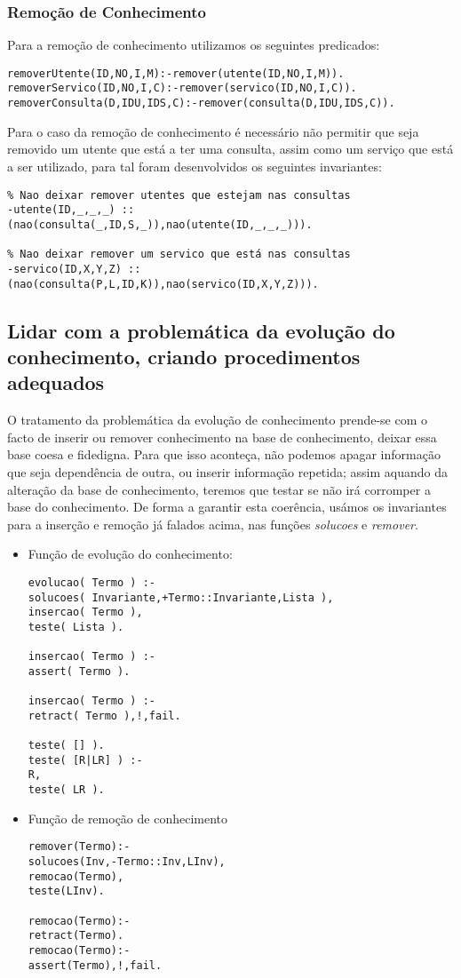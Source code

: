 \subsubsection{Remoção de Conhecimento}
Para a remoção de conhecimento utilizamos os seguintes predicados: 
\begin{verbatim}
removerUtente(ID,NO,I,M):-remover(utente(ID,NO,I,M)).
removerServico(ID,NO,I,C):-remover(servico(ID,NO,I,C)).
removerConsulta(D,IDU,IDS,C):-remover(consulta(D,IDU,IDS,C)).
\end{verbatim}

Para o caso da remoção de conhecimento é necessário não permitir que seja removido um utente que está a ter uma consulta, assim como um serviço que está a ser utilizado, para tal foram desenvolvidos os seguintes invariantes: 

\begin{verbatim}
% Nao deixar remover utentes que estejam nas consultas
-utente(ID,_,_,_) :: 
(nao(consulta(_,ID,S,_)),nao(utente(ID,_,_,_))).

% Nao deixar remover um servico que está nas consultas 
-servico(ID,X,Y,Z) :: 
(nao(consulta(P,L,ID,K)),nao(servico(ID,X,Y,Z))).
\end{verbatim}


\subsection{Lidar com a problemática da evolução do conhecimento, criando procedimentos adequados}

O tratamento da problemática da evolução de conhecimento prende-se com o facto de inserir ou remover conhecimento na base de conhecimento, deixar essa base coesa e fidedigna. Para que isso aconteça, não podemos apagar informação que seja dependência de outra, ou inserir informação repetida; assim aquando da alteração da base de conhecimento, teremos que testar se não irá corromper a base do conhecimento. De forma a garantir esta coerência, usámos os invariantes para a inserção e remoção já falados acima, nas funções \textit{solucoes} e \textit{remover}. 

\begin{itemize}
\item Função de evolução do conhecimento: 
\begin{verbatim}
evolucao( Termo ) :-
solucoes( Invariante,+Termo::Invariante,Lista ),
insercao( Termo ),
teste( Lista ).

insercao( Termo ) :-
assert( Termo ).

insercao( Termo ) :-
retract( Termo ),!,fail.

teste( [] ).
teste( [R|LR] ) :-
R,
teste( LR ).
\end{verbatim}
\item Função de remoção de conhecimento

\begin{verbatim}
remover(Termo):-
solucoes(Inv,-Termo::Inv,LInv),
remocao(Termo),
teste(LInv).

remocao(Termo):-
retract(Termo).
remocao(Termo):-
assert(Termo),!,fail.
\end{verbatim}

\end{itemize}

